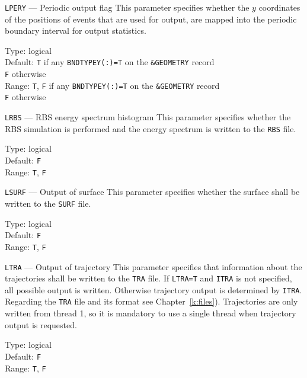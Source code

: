 \begin{keydescription}{\texttt{LPERY} --- Periodic output flag}
%
  This parameter specifies whether the $y$ coordinates of the positions of events that are used 
  for output, are mapped into the periodic boundary interval for output statistics.
  \begin{keytab}
    Type:    \> logical \\
    Default: \> \texttt{T} if any \texttt{BNDTYPEY(:)=T} on the 
                \texttt{\&GEOMETRY} record \\
             \> \texttt{F} otherwise \\
    Range:   \> \texttt{T}, \texttt{F}  if any \texttt{BNDTYPEY(:)=T} on the 
                \texttt{\&GEOMETRY} record \\
             \> \texttt{F} otherwise \\
  \end{keytab}
\end{keydescription}

\begin{keydescription}{\texttt{LRBS} --- RBS energy spectrum histogram}
%
  This parameter specifies whether the RBS simulation is performed and the energy spectrum is 
  written to the \texttt{RBS} file.
  \begin{keytab}
    Type:    \> logical \\
    Default: \> \texttt{F} \\
    Range:   \> \texttt{T}, \texttt{F} 
  \end{keytab}
\end{keydescription}

\ifprivate
\begin{keydescription}{\texttt{LSURF} --- Output of surface}
%
  This parameter specifies whether the surface shall be written to the \texttt{SURF} file.
 \begin{keytab}
    Type:    \> logical \\
    Default: \> \texttt{F} \\
    Range:   \> \texttt{T}, \texttt{F} 
  \end{keytab}
\end{keydescription}
\fi

\begin{keydescription}{\texttt{LTRA} --- Output of trajectory}
%
  This parameter specifies that information about the trajectories shall be written to the 
  \texttt{TRA} file. 
  If \texttt{LTRA=T} and \texttt{ITRA} is not specified, all possible output is written. 
  Otherwise trajectory output is determined by \texttt{ITRA}.
  Regarding the \texttt{TRA} file and its format see Chapter~\ref{k:files}). 
  Trajectories are only written from thread 1, so it is mandatory to use a single thread 
  when trajectory output is requested.
  \begin{keytab}
    Type:    \> logical \\
    Default: \> \texttt{F} \\
    Range:   \> \texttt{T}, \texttt{F} 
  \end{keytab}
\end{keydescription}

